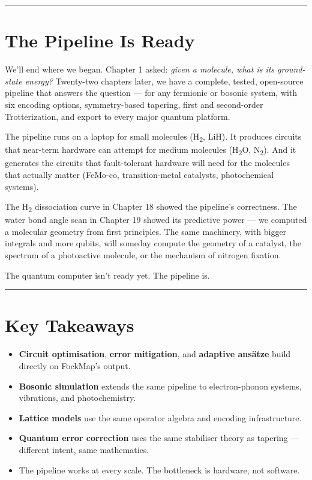\documentclass[
  11pt,
  oneside]{book}
\providecommand{\tightlist}{%
  \setlength{\itemsep}{0pt}\setlength{\parskip}{0pt}}
\begin{document}
\begin{center}\rule{0.5\linewidth}{0.5pt}\end{center}

\section{The Pipeline Is Ready}\label{the-pipeline-is-ready}

We'll end where we began. Chapter 1 asked: \emph{given a molecule, what
is its ground-state energy?} Twenty-two chapters later, we have a
complete, tested, open-source pipeline that answers the question --- for
any fermionic or bosonic system, with six encoding options,
symmetry-based tapering, first and second-order Trotterization, and
export to every major quantum platform.

The pipeline runs on a laptop for small molecules (H\textsubscript{2}, LiH). It produces
circuits that near-term hardware can attempt for medium molecules (H\textsubscript{2}O,
N\textsubscript{2}). And it generates the circuits that fault-tolerant hardware will
need for the molecules that actually matter (FeMo-co, transition-metal
catalysts, photochemical systems).

The H\textsubscript{2} dissociation curve in Chapter 18 showed the pipeline's
correctness. The water bond angle scan in Chapter 19 showed its
predictive power --- we computed a molecular geometry from first
principles. The same machinery, with bigger integrals and more qubits,
will someday compute the geometry of a catalyst, the spectrum of a
photoactive molecule, or the mechanism of nitrogen fixation.

The quantum computer isn't ready yet. The pipeline is.

\begin{center}\rule{0.5\linewidth}{0.5pt}\end{center}

\section{Key Takeaways}\label{key-takeaways-22}

\begin{itemize}
\tightlist
\item
  \textbf{Circuit optimisation}, \textbf{error mitigation}, and
  \textbf{adaptive ansätze} build directly on FockMap's output.
\item
  \textbf{Bosonic simulation} extends the same pipeline to
  electron-phonon systems, vibrations, and photochemistry.
\item
  \textbf{Lattice models} use the same operator algebra and encoding
  infrastructure.
\item
  \textbf{Quantum error correction} uses the same stabiliser theory as
  tapering --- different intent, same mathematics.
\item
  The pipeline works at every scale. The bottleneck is hardware, not
  software.
\end{itemize}
\end{document}
